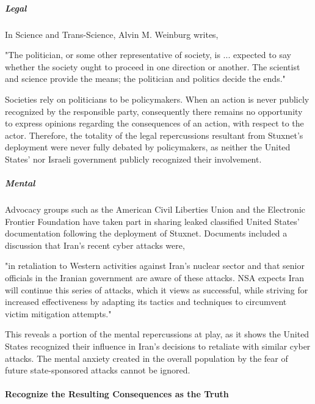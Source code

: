 \documentclass[12pt]{article}
\begin{document}
\begin{multicols}{2}
\subparagraph{Legal}

In Science and Trans-Science, Alvin M. Weinburg writes,

\begin{displayquote}
"The politician, or some other representative of society, is ... expected to say whether the society ought to proceed in one direction or another. The scientist and science provide the means; the politician and politics decide the ends."\cite{scienceAndTransScience}
\end{displayquote}

Societies rely on politicians to be policymakers. When an action is never publicly recognized by the responsible party, consequently there remains no opportunity to express opinions regarding the consequences of an action, with respect to the actor. Therefore, the totality of the legal repercussions resultant from Stuxnet's deployment were never fully debated by policymakers, as neither the United States' nor Israeli government publicly recognized their involvement.

\subparagraph{Mental}

Advocacy groups such as the American Civil Liberties Union and the Electronic Frontier Foundation have taken part in sharing leaked classified United States' documentation following the deployment of Stuxnet. Documents included a discussion that Iran's recent cyber attacks were, 

\begin{displayquote}
"in retaliation to Western activities against Iran's nuclear sector and that senior officials in the Iranian government are aware of these attacks. NSA expects Iran will continue this series of attacks, which it views as successful, while striving for increased effectiveness by adapting its tactics and techniques to circumvent victim mitigation attempts."\cite{effForwardsIranDiscussion}\cite{acluForwardsIranDiscussion}
\end{displayquote}

This reveals a portion of the mental repercussions at play, as it shows the United States recognized their influence in Iran's decisions to retaliate with similar cyber attacks. The mental anxiety created in the overall population by the fear of future state-sponsored attacks cannot be ignored. 

\paragraph{Recognize the Resulting Consequences as the Truth}


\end{multicols}
\end{document}
